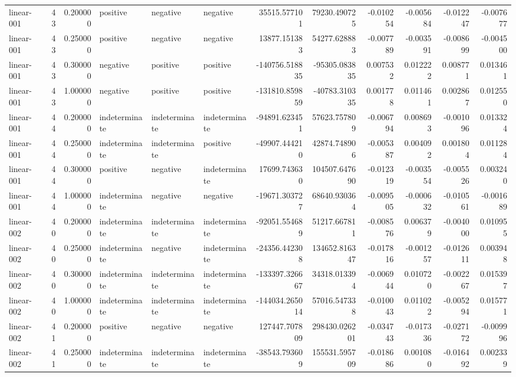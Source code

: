 \begin{tabular}{lrrlllrrrrrr}
linear-001 & 43 & 0.200000 & positive & negative & negative & 35515.577101 & 79230.490725 & -0.010254 & -0.005684 & -0.012247 & -0.007677 \\
linear-001 & 43 & 0.250000 & positive & negative & negative & 13877.151383 & 54277.628883 & -0.007789 & -0.003591 & -0.008699 & -0.004500 \\
linear-001 & 43 & 0.300000 & negative & positive & positive & -140756.518835 & -95305.083835 & 0.007532 & 0.012222 & 0.008771 & 0.013461 \\
linear-001 & 43 & 1.000000 & negative & positive & positive & -131810.859859 & -40783.310335 & 0.001778 & 0.011461 & 0.002867 & 0.012550 \\
linear-001 & 44 & 0.200000 & indeterminate & indeterminate & indeterminate & -94891.623451 & 57623.757809 & -0.006794 & 0.008693 & -0.001096 & 0.013324 \\
linear-001 & 44 & 0.250000 & indeterminate & indeterminate & positive & -49907.444210 & 42874.748906 & -0.005387 & 0.004092 & 0.001804 & 0.011284 \\
linear-001 & 44 & 0.300000 & positive & negative & indeterminate & 17699.743630 & 104507.647690 & -0.012319 & -0.003554 & -0.005526 & 0.003240 \\
linear-001 & 44 & 1.000000 & indeterminate & negative & negative & -19671.303727 & 68640.930364 & -0.009505 & -0.000632 & -0.010561 & -0.001689 \\
linear-002 & 40 & 0.200000 & indeterminate & indeterminate & indeterminate & -92051.554689 & 51217.667811 & -0.008576 & 0.006379 & -0.004000 & 0.010955 \\
linear-002 & 40 & 0.250000 & indeterminate & negative & indeterminate & -24356.442308 & 134652.816347 & -0.017816 & -0.001257 & -0.012611 & 0.003948 \\
linear-002 & 40 & 0.300000 & indeterminate & indeterminate & indeterminate & -133397.326667 & 34318.013394 & -0.006944 & 0.010720 & -0.002267 & 0.015397 \\
linear-002 & 40 & 1.000000 & indeterminate & indeterminate & indeterminate & -144034.265014 & 57016.547338 & -0.010043 & 0.011022 & -0.005294 & 0.015771 \\
linear-002 & 41 & 0.200000 & positive & negative & negative & 127447.707809 & 298430.026201 & -0.034743 & -0.017336 & -0.027172 & -0.009996 \\
linear-002 & 41 & 0.250000 & indeterminate & indeterminate & indeterminate & -38543.793609 & 155531.595709 & -0.018686 & 0.001080 & -0.016492 & 0.002339 \\

\end{tabular}
